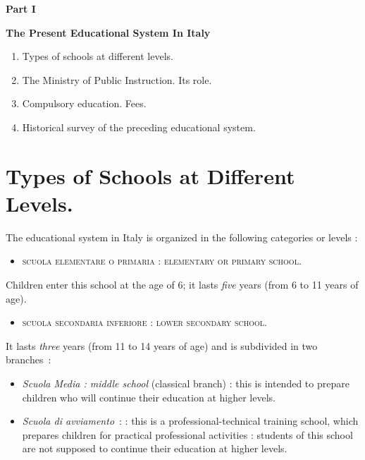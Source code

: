 \medskip
\begin{center}
{\large\bf Part I}\relax
\bigskip

{\bf The Present Educational System In Italy}
\end{center}
\begin{enumerate}
\item Types of schools at different levels.

\item The Ministry of Public Instruction. Its role.

\item Compulsory education. Fees.

\item Historical survey of the preceding educational system.
\end{enumerate}

\section*{Types of Schools at Different Levels.}

The educational system in Italy is organized in the following categories or levels :
\begin{itemize}
\item[I.] \textsc{scuola elementare o primaria : elementary or primary school.}
\end{itemize}

Children enter this school at the age of 6; it lasts {\em five} {\rm y}ears (from 6 to 11 years of age).
\begin{itemize}
\item[II.] \textsc{scuola secondaria inferiore : lower secondary school.}
\end{itemize}

It lasts {\em three} years (from 11 to 14 years of age) and is subdivided in two branches~:
\begin{itemize}
\item[a.] {\em Scuola Media : middle school} (classical branch) : this is intended to prepare children who will continue their education at higher levels.

\item[b.] {\em Scuola di avviamento}~: : this is a professional-technical training school, which prepares children for practical professional activities : students of this school are not supposed to continue their education at higher levels.  
\end{itemize}

